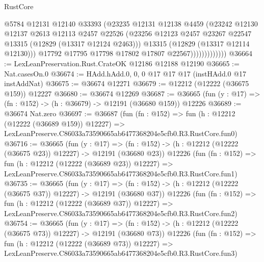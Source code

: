 \begin{lexlean}{RustCore}
\begin{coremodule}
                            @5784
                            @12131
                            @12140
                            @33393
                            (@23235
                              @12131
                              @12138
                              @4459
                              (@23242
                                @12130
                                @12137
                                @2613
                                @12113
                                @2457
                                @22526
                                (@23256
                                  @12123
                                  @2457
                                  @23267
                                  @22547
                                  @13315
                                  (@12829 (@13317 @12124 @2463)))
                                @13315
                                (@12829 (@13317 @12114 @12130)))
                              @17792
                              @17795
                              @17798
                              @17802
                              @17807
                              @22567)))))))))))))
@36664 := LexLeanPreservation.Rust.CrateOK @12186 @12188 @12190
@36665 := Nat.casesOn.{0}
@36674 := HAdd.hAdd.{0, 0, 0} @17 @17 @17 (instHAdd.{0} @17 instAddNat)
@36675 := @36674 @12271
@36679 := @12212 (@12222 (@36675 @159)) @12227
@36680 := @36674 @12269
@36687 := @36665 (fun (y : @17) => (fn : @152) -> (h : @36679) -> @12191 (@36680 @159)) @12226
@36689 := @36674 Nat.zero
@36697 := @36687
    (fun (fn : @152) =>
    fun (h : @12212 (@12222 (@36689 @159)) @12227) =>
    LexLeanPreserve.C86033a73590665ab6477368204e5cfb0.R3.RustCore.fun0)
@36716 := @36665
    (fun (y : @17) =>
    (fn : @152) -> (h : @12212 (@12222 (@36675 @23)) @12227) -> @12191 (@36680 @23))
    @12226
    (fun (fn : @152) =>
    fun (h : @12212 (@12222 (@36689 @23)) @12227) =>
    LexLeanPreserve.C86033a73590665ab6477368204e5cfb0.R3.RustCore.fun1)
@36735 := @36665
    (fun (y : @17) =>
    (fn : @152) -> (h : @12212 (@12222 (@36675 @37)) @12227) -> @12191 (@36680 @37))
    @12226
    (fun (fn : @152) =>
    fun (h : @12212 (@12222 (@36689 @37)) @12227) =>
    LexLeanPreserve.C86033a73590665ab6477368204e5cfb0.R3.RustCore.fun2)
@36754 := @36665
    (fun (y : @17) =>
    (fn : @152) -> (h : @12212 (@12222 (@36675 @73)) @12227) -> @12191 (@36680 @73))
    @12226
    (fun (fn : @152) =>
    fun (h : @12212 (@12222 (@36689 @73)) @12227) =>
    LexLeanPreserve.C86033a73590665ab6477368204e5cfb0.R3.RustCore.fun3)

\end{coremodule}
\end{lexlean}
